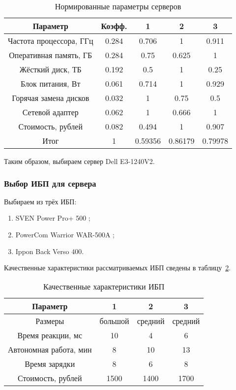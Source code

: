 \begin{table}[h]
\caption{Нормированные параметры серверов}
\label{table:server_compare}
\centering
  \begin{tabular}{|c|c|c|c|c|}
  \hline Параметр                & Коэфф. & 1     & 2     & 3 \\
  \hline Частота процессора, ГГц & 0.284  & 0.706 & 1     & 0.911 \\
  \hline Оперативная память, ГБ  & 0.284  & 0.75  & 0.625 & 1 \\
  \hline Жёсткий диск, ТБ        & 0.192  & 0.5   & 1     & 0.25 \\
  \hline Блок питания, Вт        & 0.061  & 0.714 & 1     & 0.929 \\
  \hline Горячая замена дисков   & 0.032  & 1     & 0.75  & 0.5 \\
  \hline Сетевой адаптер         & 0.062  & 1     & 0.666 & 1 \\
  \hline Стоимость, рублей       & 0.082  & 0.494 & 1     & 0.907 \\
  \hline Итог                    & 1      & 0.59356 & 0.86179 & 0.79978 \\
  \hline
  \end{tabular}
\end{table}

Таким образом, выбираем сервер Dell E3-1240V2.

\subsubsection{Выбор ИБП для сервера}

Выбираем из трёх ИБП:
\begin{enumerate}
\item SVEN Power Pro+ 500 ;
\item PowerCom Warrior WAR-500A ;
\item Ippon Back Verso 400.
\end{enumerate}

Качественные характеристики рассматриваемых ИБП сведены в таблицу~\ref{table:ibp_compare_qual}.

\begin{table}[h]
\caption{Качественные характеристики ИБП}
\label{table:ibp_compare_qual}
\centering
  \begin{tabular}{|c|c|c|c|}
  \hline Параметр & 1 & 2 & 3 \\
  \hline Размеры & большой & средний & средний \\
  \hline Время реакции, мс & 10 & 4 & 6 \\
  \hline Автономная работа, мин & 8 & 10 & 13 \\
  \hline Время зарядки & 8 & 6 & 8 \\
  \hline Стоимость, рублей & 1500 & 1400 & 1700 \\
  \hline
  \end{tabular}
\end{table}

